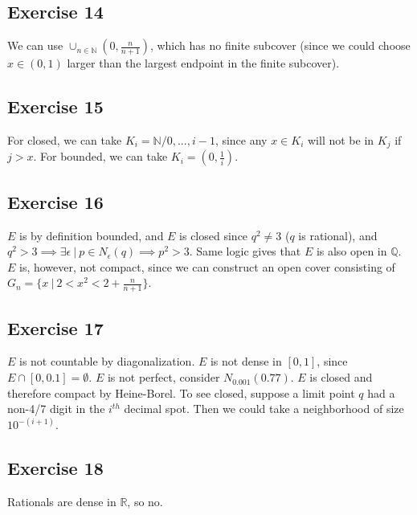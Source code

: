 \subsection{Exercise 14}
We can use $\cup_{n \in \mathbb{N}} (0, \frac{n}{n + 1})$, which has no finite subcover
(since we could choose $x \in (0, 1)$ larger than the largest endpoint in the finite subcover).

\subsection{Exercise 15}
For closed, we can take $K_i = \mathbb{N} / {0, ..., i - 1}$, since any $x \in K_i$ will not
be in $K_j$ if $j > x$. For bounded, we can take $K_i = (0, \frac{1}{i})$.

\subsection{Exercise 16}
$E$ is by definition bounded, and $E$ is closed since $q^2 \neq 3$ ($q$ is rational), and
$q^2 > 3 \implies \exists \epsilon \: | \: p  \in N_{\epsilon}(q) \implies p^2 > 3$. Same
logic gives that $E$ is also open in $\mathbb{Q}$. $E$ is, however, not compact, since
we can construct an open cover consisting of $G_n = \{x \: | \: 2 < x^2 < 2 + \frac{n}{n+1}\}$.

\subsection{Exercise 17}
$E$ is not countable by diagonalization. $E$ is not dense in $[0, 1]$, since $E \cap [0, 0.1] = \emptyset$.
$E$ is not perfect, consider $N_{0.001}(0.77)$. $E$ is closed and therefore compact by Heine-Borel.
To see closed, suppose a limit point $q$ had a non-4/7 digit in the $i^{th}$ decimal spot. Then we could
take a neighborhood of size $10^{-(i + 1)}$.

\subsection{Exercise 18}
Rationals are dense in $\mathbb{R}$, so no.
